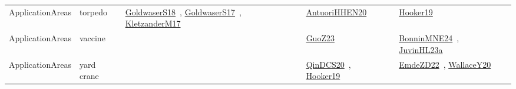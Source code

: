{\begin{longtable}{lp{3cm}>{\raggedright\arraybackslash}p{6cm}>{\raggedright\arraybackslash}p{6cm}>{\raggedright\arraybackslash}p{8cm}}
ApplicationAreas & torpedo & \href{../works/GoldwaserS18.pdf}{GoldwaserS18}~\cite{GoldwaserS18}, \href{../works/GoldwaserS17.pdf}{GoldwaserS17}~\cite{GoldwaserS17}, \href{../works/KletzanderM17.pdf}{KletzanderM17}~\cite{KletzanderM17} & \href{../works/AntuoriHHEN20.pdf}{AntuoriHHEN20}~\cite{AntuoriHHEN20} & \href{../works/Hooker19.pdf}{Hooker19}~\cite{Hooker19}\\
ApplicationAreas & vaccine &  & \href{../works/GuoZ23.pdf}{GuoZ23}~\cite{GuoZ23} & \href{../works/BonninMNE24.pdf}{BonninMNE24}~\cite{BonninMNE24}, \href{../works/JuvinHL23a.pdf}{JuvinHL23a}~\cite{JuvinHL23a}\\
ApplicationAreas & yard crane &  & \href{../works/QinDCS20.pdf}{QinDCS20}~\cite{QinDCS20}, \href{../works/Hooker19.pdf}{Hooker19}~\cite{Hooker19} & \href{../works/EmdeZD22.pdf}{EmdeZD22}~\cite{EmdeZD22}, \href{../works/WallaceY20.pdf}{WallaceY20}~\cite{WallaceY20}\\
\end{longtable}
}

